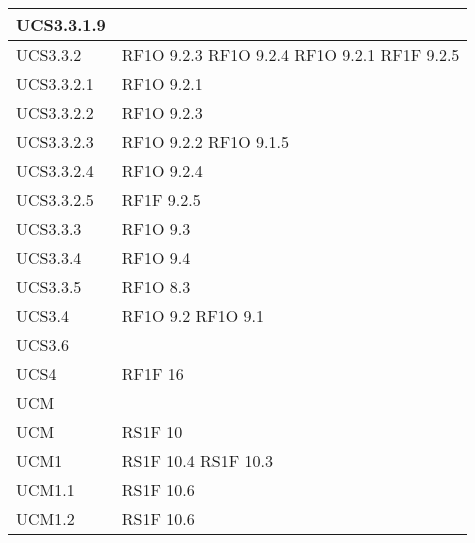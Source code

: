 \begin{center}
\begin{longtable}{ | p{5cm} | p{5cm} |}
            UCS3.3.1.9 &  \\ \hline      
            UCS3.3.2 &  RF1O 9.2.3 \newline  RF1O 9.2.4 \newline  RF1O 9.2.1  \newline  RF1F 9.2.5 \newline  \\ \hline      
            UCS3.3.2.1 &  RF1O 9.2.1  \newline  \\ \hline      
            UCS3.3.2.2 &  RF1O 9.2.3 \newline  \\ \hline      
            UCS3.3.2.3 &  RF1O 9.2.2  \newline  RF1O 9.1.5 \newline  \\ \hline      
            UCS3.3.2.4 &  RF1O 9.2.4 \newline  \\ \hline      
            UCS3.3.2.5 &  RF1F 9.2.5 \newline  \\ \hline      
            UCS3.3.3 &  RF1O 9.3 \newline  \\ \hline      
            UCS3.3.4 &  RF1O 9.4 \newline  \\ \hline      
            UCS3.3.5 &  RF1O 8.3 \newline  \\ \hline      
            UCS3.4 &  RF1O 9.2 \newline  RF1O 9.1  \newline  \\ \hline      
            UCS3.6 &  \\ \hline      
            UCS4 &  RF1F 16 \newline  \\ \hline      
            UCM &  \\ \hline      
            UCM &  RS1F 10 \newline  \\ \hline      
            UCM1 &  RS1F 10.4 \newline  RS1F 10.3 \newline  \\ \hline      
            UCM1.1 &  RS1F 10.6 \newline  \\ \hline      
            UCM1.2 &  RS1F 10.6 \newline  \\ \hline      

\end{longtable}
\end{center}
